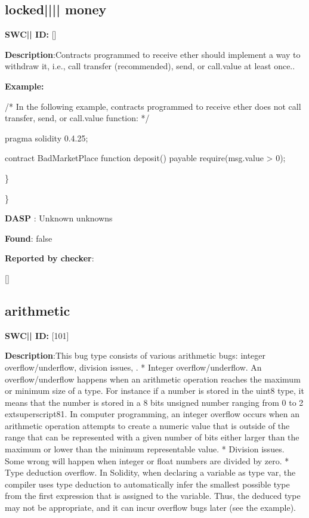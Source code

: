 \documentclass{article}
\begin{document}
\subsection{locked{||\textunderscore|| }money} 
\textbf{SWC{|\textunderscore| }ID:} []

\textbf{Description}:Contracts programmed to receive ether should implement a way to withdraw it, i.e., call transfer (recommended), send, or call.value at least once..


\textbf{Example:} 
\begin{ffcode} 

/* In the following example, contracts programmed to receive ether does not call transfer, send, or call.value function: */ 

pragma solidity 0.4.25;

contract BadMarketPlace {
    function deposit() payable {
        require(msg.value > 0);
    }
}

\end{ffcode} 
\} 

\} 

\textbf{DASP} : Unknown unknowns

\textbf{Found}: false

\textbf{Reported by checker}: 
\begin{ffcode} 

[]
\end{ffcode} 
\subsection{arithmetic} 
\textbf{SWC{|\textunderscore| }ID:} [101]

\textbf{Description}:This bug type consists of various arithmetic bugs: integer overflow/underflow, division issues, .
* Integer overflow/underflow. An overflow/underflow happens when an arithmetic operation reaches the maximum or minimum size of a type. For instance if a number is stored in the uint8 type, it means that the number is stored in a 8 bits unsigned number ranging from 0 to 2{	extsuperscript}8{\textendash}1. In computer programming, an integer overflow occurs when an arithmetic operation attempts to create a numeric value that is outside of the range that can be represented with a given number of bits either larger than the maximum or lower than the minimum representable value.
* Division issues. Some wrong will happen when integer or float numbers are divided by zero.
* Type deduction overflow. In Solidity, when declaring a variable as type var, the compiler uses type deduction to automatically infer the smallest possible type from the first expression that is assigned to the variable. Thus, the deduced type may not be appropriate, and it can incur overflow bugs later (see the example).
\end{document}
